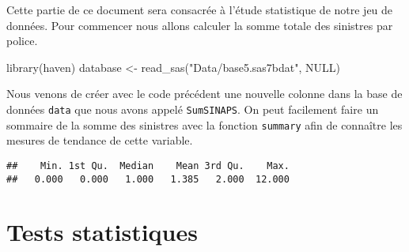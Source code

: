 \documentclass[
]{book}
\newenvironment{Shaded}{\begin{snugshade}}{\end{snugshade}}
\newcommand{\ConstantTok}[1]{\textcolor[rgb]{0.00,0.00,0.00}{#1}}
\newcommand{\DecValTok}[1]{\textcolor[rgb]{0.00,0.00,0.81}{#1}}
\newcommand{\FunctionTok}[1]{\textcolor[rgb]{0.00,0.00,0.00}{#1}}
\newcommand{\NormalTok}[1]{#1}
\newcommand{\OtherTok}[1]{\textcolor[rgb]{0.56,0.35,0.01}{#1}}
\newcommand{\SpecialCharTok}[1]{\textcolor[rgb]{0.00,0.00,0.00}{#1}}
\newcommand{\StringTok}[1]{\textcolor[rgb]{0.31,0.60,0.02}{#1}}
\theoremstyle{definition}
\theoremstyle{definition}
\theoremstyle{definition}
\theoremstyle{definition}
\theoremstyle{remark}
\begin{document}
Cette partie de ce document sera consacrée à l'étude statistique de notre jeu de données.
Pour commencer nous allons calculer la somme totale des sinistres par police.

\begin{Shaded}
\begin{Highlighting}[]
\FunctionTok{library}\NormalTok{(haven)}
\NormalTok{database }\OtherTok{\textless{}{-}} \FunctionTok{read\_sas}\NormalTok{(}\StringTok{"Data/base5.sas7bdat"}\NormalTok{, }
    \ConstantTok{NULL}\NormalTok{)}
\end{Highlighting}
\end{Shaded}

\begin{Shaded}
\end{Shaded}

Nous venons de créer avec le code précédent une nouvelle colonne dans la base de données \texttt{data} que nous avons appelé \texttt{SumSINAPS}.
On peut facilement faire un sommaire de la somme des sinistres avec la fonction \texttt{summary} afin de connaître les mesures de tendance de cette variable.

\begin{Shaded}
\end{Shaded}

\begin{verbatim}
##    Min. 1st Qu.  Median    Mean 3rd Qu.    Max. 
##   0.000   0.000   1.000   1.385   2.000  12.000
\end{verbatim}

\hypertarget{tests-statistiques}{%
\section{Tests statistiques}\label{tests-statistiques}}
\end{document}
